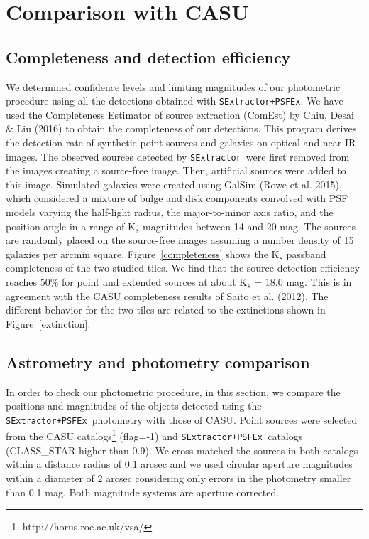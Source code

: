 \documentclass[preprint2]{aastex}
\newcommand{\se}{{\tt SExtractor\ }}
\newcommand{\dos}{{\tt SExtractor+PSFEx\ }}
\begin{document}
{\section{Comparison with CASU}

\subsection{Completeness and detection efficiency}
%

  We determined confidence levels and limiting magnitudes of our photometric
  procedure using all the detections obtained with {\tt SExtractor+PSFEx}.
  We have
used the Completeness Estimator of source extraction (ComEst)
by Chiu, Desai \& Liu (2016) to obtain the completeness of our detections.  
This program
derives the detection rate of synthetic point sources
and galaxies on optical and near-IR images.  The observed sources detected
by \se were first removed from the images creating a
source-free image.  Then, artificial sources were added to this image.
Simulated galaxies were created using
GalSim (Rowe et al. 2015), which considered a 
mixture of bulge and disk components convolved with PSF models
varying the half-light radius,
the major-to-minor axis ratio, and the position angle in a range of K$_s$
magnitudes between 14 and 20 mag.  The sources are randomly 
placed on the source-free images assuming a number density of 15 galaxies
per arcmin square. Figure~\ref{completeness} shows the K$_s$ passband
completeness of the two studied tiles. We find that
the source detection efficiency reaches 50\% for point and extended sources
at about K$_s$ = 18.0 mag.  This is in agreement with
the CASU completeness results of Saito et al.
(2012).   The different behavior for the two
tiles are related to the extinctions shown in Figure~\ref{extinction}.  


\subsection{Astrometry and photometry comparison}


 In order to check our photometric procedure, in this section,  we compare 
the positions and magnitudes of the objects detected using the \dos photometry 
with those of CASU.   Point sources were selected from the CASU catalogs\footnote{
    http://horus.roe.ac.uk/vsa/}
  (flag=-1) and
  \dos catalogs (CLASS\_STAR higher than 0.9).  We cross-matched the sources
  in both catalogs
  within a distance radius of 0.1 arcsec and we used circular aperture
  magnitudes within a diameter of 2
  arcsec considering only  errors in the photometry smaller than 0.1 mag.  
  Both magnitude systems are aperture corrected.

}
\end{document}
